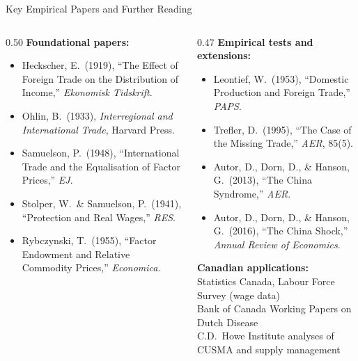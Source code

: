 \documentclass[aspectratio=169]{beamer}
\begin{document}
\begin{frame}[shrink=12]{Key Empirical Papers and Further Reading}
\begin{columns}[T]
\begin{column}{0.50\textwidth}
\textbf{Foundational papers:}
\begin{itemize}\small
  \item Heckscher, E.\ (1919), ``The Effect of Foreign
        Trade on the Distribution of Income,''
        \textit{Ekonomisk Tidskrift}.
  \item Ohlin, B.\ (1933), \textit{Interregional and
        International Trade}, Harvard Press.
  \item Samuelson, P.\ (1948), ``International Trade
        and the Equalisation of Factor Prices,''
        \textit{EJ}.
  \item Stolper, W.\ \& Samuelson, P.\ (1941),
        ``Protection and Real Wages,'' \textit{RES}.
  \item Rybczynski, T.\ (1955), ``Factor Endowment
        and Relative Commodity Prices,''
        \textit{Economica}.
\end{itemize}
\end{column}
\begin{column}{0.47\textwidth}
\textbf{Empirical tests and extensions:}
\begin{itemize}\small
  \item Leontief, W.\ (1953), ``Domestic Production
        and Foreign Trade,'' \textit{PAPS}.
  \item Trefler, D.\ (1995), ``The Case of the
        Missing Trade,'' \textit{AER}, 85(5).
  \item Autor, D., Dorn, D., \& Hanson, G.\ (2013),
        ``The China Syndrome,'' \textit{AER}.
  \item Autor, D., Dorn, D., \& Hanson, G.\ (2016),
        ``The China Shock,''
        \textit{Annual Review of Economics}.
\end{itemize}
\vspace{0.3em}
\begin{varbox}
\footnotesize\textbf{Canadian applications:}\\
Statistics Canada, Labour Force Survey (wage data)\\
Bank of Canada Working Papers on Dutch Disease\\
C.D.\ Howe Institute analyses of CUSMA and supply
management
\end{varbox}
\end{column}
\end{columns}
\end{frame}
\end{document}
